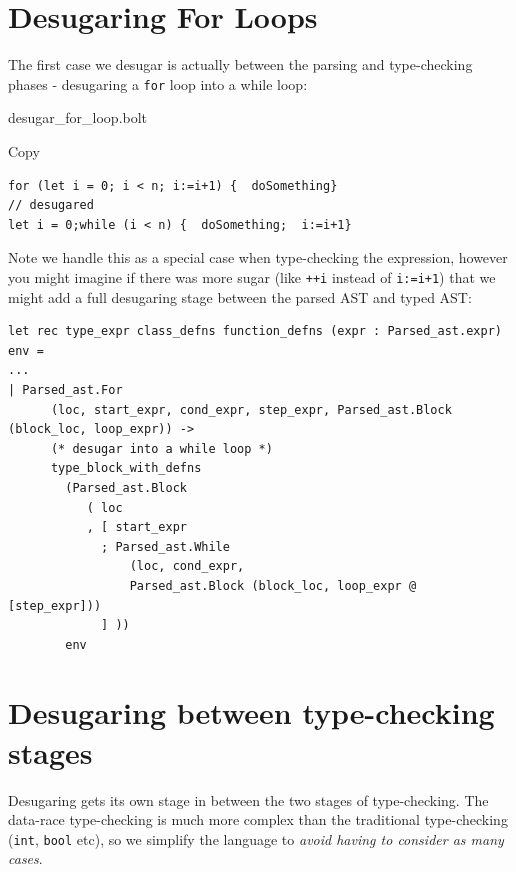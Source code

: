 \hypertarget{desugaring-for-loops}{%
\section{\texorpdfstring{\protect\hyperlink{desugaring-for-loops}{}Desugaring
For Loops}{Desugaring For Loops}}\label{desugaring-for-loops}}

The first case we desugar is actually between the parsing and
type-checking phases - desugaring a \texttt{for} loop into a while loop:

{desugar\_for\_loop.bolt}

Copy

\begin{verbatim}
for (let i = 0; i < n; i:=i+1) {  doSomething}
// desugared
let i = 0;while (i < n) {  doSomething;  i:=i+1}
\end{verbatim}

Note we handle this as a special case when type-checking the expression,
however you might imagine if there was more sugar (like \texttt{++i}
instead of \texttt{i:=i+1}) that we might add a full desugaring stage
between the parsed AST and typed AST:

\begin{lstlisting}[language=caml,caption={type\_expr.ml}]
let rec type_expr class_defns function_defns (expr : Parsed_ast.expr) env =
...
| Parsed_ast.For
      (loc, start_expr, cond_expr, step_expr, Parsed_ast.Block (block_loc, loop_expr)) ->
      (* desugar into a while loop *)
      type_block_with_defns
        (Parsed_ast.Block
           ( loc
           , [ start_expr
             ; Parsed_ast.While
                 (loc, cond_expr,
                 Parsed_ast.Block (block_loc, loop_expr @ [step_expr]))
             ] ))
        env
\end{lstlisting}
\hypertarget{desugaring-between-type-checking-stages}{%
\section{\texorpdfstring{\protect\hyperlink{desugaring-between-type-checking-stages}{}Desugaring
between type-checking
stages}{Desugaring between type-checking stages}}\label{desugaring-between-type-checking-stages}}

Desugaring gets its own stage in between the two stages of
type-checking. The data-race type-checking is much more complex than the
traditional type-checking (\texttt{int}, \texttt{bool} etc), so we
simplify the language to \emph{avoid having to consider as many cases}.

